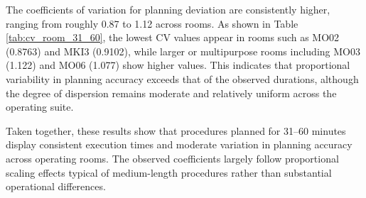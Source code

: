 \documentclass[
]{article}
\begin{document}
The coefficients of variation for planning deviation are consistently
higher, ranging from roughly 0.87 to 1.12 across rooms. As shown in
Table \ref{tab:cv_room_31_60}, the lowest CV values appear in rooms such
as MO02 (0.8763) and MKI3 (0.9102), while larger or multipurpose rooms
including MO03 (1.122) and MO06 (1.077) show higher values. This
indicates that proportional variability in planning accuracy exceeds
that of the observed durations, although the degree of dispersion
remains moderate and relatively uniform across the operating suite.

Taken together, these results show that procedures planned for 31--60
minutes display consistent execution times and moderate variation in
planning accuracy across operating rooms. The observed coefficients
largely follow proportional scaling effects typical of medium-length
procedures rather than substantial operational differences.
\end{document}
